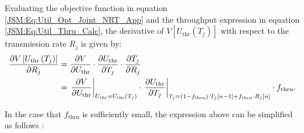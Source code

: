 \begin{apendicesenv}
Evaluating the objective function in equation \eqref{JSM:Eq:Util_Opt_Joint_NRT_App} and the throughput expression in equation \eqref{JSM:Eq:Util_Thru_Calc}, the derivative of $V\left[U_{\mathrm{thr}}\left(T_{j}\right)\right]$ with respect to the transmission rate $R_j$ is given by:
%
\begin{align}
\label{JSM:Eq:Utility_Derivative_NRT}
\frac{\partial V\left[U_{\mathrm{thr}}\left(T_j\right)\right]}{\partial R_j} & = \frac{\partial V}{\partial U_{\mathrm{thr}}} \cdot \frac{\partial U_{\mathrm{thr}}}{\partial T_j} \cdot \frac{\partial T_j}{\partial R_j} \notag\\ & = \left.\dfrac{\partial V}{\partial U_{\mathrm{thr}}}\right\vert_{U_{\mathrm{thr}} = U_{\mathrm{thr}}\left(T_{j}\right)} \cdot \left.\dfrac{\partial U_{\mathrm{thr}}}{\partial T_j}\right\vert_{T_{j} = \left(1 - f_{\mathrm{thru}}\right) \cdot T_{j}\left[n-1\right] + f_{\mathrm{thru}} \cdot R_j\left[n\right]}
\cdot f_{\mathrm{thru}}.
\end{align}

In the case that $f_{\mathrm{thru}}$ is sufficiently small, the expression above can be simplified as follows \cite{Art:Song2005_p2}:


\end{apendicesenv}
